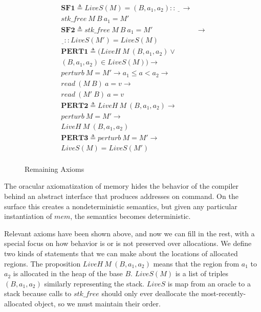 \documentclass{article}
\begin{document}
\begin{figure}
\begin{minipage}{0.5\textwidth}
\[\begin{aligned}
    \mathbf{SF1} \triangleq \mathit{LiveS}(M) = (B,a_1,a_2)::\underline{~~~} \rightarrow & \\
    \mathit{stk\_free} ~ M ~ B ~ a_1 = M' & \\[0.75em]
    \mathbf{SF2} \triangleq 
    \mathit{stk\_free} ~ M ~ B ~ a_1 = M' & \rightarrow \\
    \underline{~~}::\mathit{LiveS}(M') = \mathit{LiveS}(M) & \\[0.75em]
    \mathbf{PERT1} \triangleq (\mathit{LiveH} ~ M ~ (B,a_1,a_2) \lor & \\
    (B,a_1,a_2) \in \mathit{LiveS}(M)) \rightarrow & \\
    \mathit{perturb} ~ M = M' \rightarrow
    a_1 \leq a < a_2 \rightarrow & \\
    \mathit{read} ~ (M~B) ~ a = v \rightarrow & \\
    \mathit{read} ~ (M'~B) ~ a = v & \\[0.75em]
    \mathbf{PERT2} \triangleq \mathit{LiveH} ~ M ~ (B,a_1,a_2) \rightarrow & \\
    \mathit{perturb} ~ M = M' \rightarrow & \\
    \mathit{LiveH} ~ M ~ (B,a_1,a_2) \\[0.75em]
    \mathbf{PERT3} \triangleq \mathit{perturb} ~ M = M' \rightarrow & \\
    \mathit{LiveS}(M) = \mathit{LiveS}(M') \\[0.75em]
    \end{aligned}\]
  \end{minipage}

  \caption{Remaining Axioms}
  \label{fig:asserts}
\end{figure}

The oracular axiomatization of memory hides the behavior of the compiler behind an abstract
interface that produces addresses on command. On the surface this creates a nondeterministic
semantics, but given any particular instantiation of \(\mathit{mem}\), the semantics
becomes deterministic.

Relevant axioms have been shown above, and now we can fill in the rest, with a special
focus on how behavior is or is not preserved over allocations. We define two kinds of statements
that we can make about the locations of allocated regions. The proposition
\(\mathit{LiveH} ~ M ~ (B, a_1, a_2)\) means that the region from \(a_1\) to \(a_2\) is
allocated in the heap of the base \(B\). \(\mathit{LiveS}(M)\) is a list of triples
\((B, a_1, a_2)\) similarly representing the stack. \(\mathit{LiveS}\) is map from an oracle
to a stack because calls to \(\mathit{stk\_free}\) should only ever deallocate
the most-recently-allocated object, so we must maintain their order.
\end{document}
